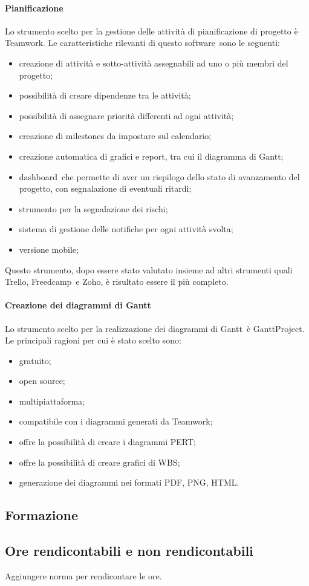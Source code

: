 \documentclass[../NormeProgetto.tex]{subfiles}
\begin{document}
			\paragraph{Pianificazione} \label{sec: Pianificazione Teamwork}
				Lo strumento scelto per la gestione delle attività di pianificazione di progetto è Teamwork\g. Le caratteristiche rilevanti di questo software\g\ sono le seguenti:
				\begin{itemize}
					\item creazione di attività e sotto-attività assegnabili ad uno o più membri del progetto;
					\item possibilità di creare dipendenze tra le attività;
					\item possibilità di assegnare priorità differenti ad ogni attività;
					\item creazione di milestones da impostare sul calendario;
					\item creazione automatica di grafici e report, tra cui il diagramma di Gantt;
					\item dashboard\g\ che permette di aver un riepilogo dello stato di avanzamento del progetto, con segnalazione di eventuali ritardi;
					\item strumento per la segnalazione dei rischi;
					\item sistema di gestione delle notifiche per ogni attività svolta;
					\item versione mobile;
				\end{itemize}		 
				Questo strumento, dopo essere stato valutato insieme ad altri strumenti quali Trello, Freedcamp\g\ e Zoho, è risultato essere il più completo.
			
			\paragraph{Creazione dei diagrammi di Gantt}
				Lo strumento scelto per la realizzazione dei diagrammi di Gantt\g\ è GanttProject. Le principali ragioni per cui è stato scelto sono:
				\begin{itemize}
					\item gratuito;
					\item open source\g;
					\item multipiattaforma;
					\item compatibile con i diagrammi generati da Teamwork\g;
					\item offre la possibilità di creare i diagrammi PERT\g;
					\item offre la possibilità di creare grafici di WBS\g;
					\item generazione dei diagrammi nei formati PDF\g, PNG\g, HTML\g.
				\end{itemize}
	\subsection{Formazione}
		\subsection{Ore rendicontabili e non rendicontabili}
			Aggiungere norma per rendicontare le ore.			
\end{document}

